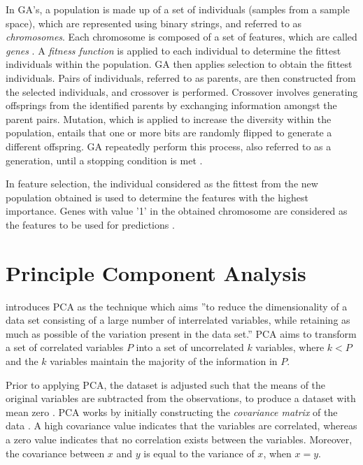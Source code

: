 In GA's, a population is made up of a set of individuals (samples from a sample space), which are represented using binary strings, and referred to as \textit{chromosomes}. Each chromosome is composed of a set of features, which are called \textit{genes} \citep{Siedlecki1989}. A \textit{fitness function} is applied to each individual to determine the fittest individuals within the population. GA then applies selection to obtain the fittest individuals. Pairs of individuals, referred to as parents, are then constructed from the selected individuals, and crossover is performed. Crossover involves generating offsprings from the identified parents by exchanging information amongst the parent pairs. Mutation, which is applied to increase the diversity within the population, entails that one or more bits are randomly flipped to generate a different offspring. GA repeatedly perform this process, also referred to as a generation, until a stopping condition is met \citep{Chaikla}. 

In feature selection, the individual considered as the fittest from the new population obtained is used to determine the features with the highest importance. Genes with value '1' in the obtained chromosome are considered as the features to be used for predictions \citep{sivanandam2007introduction}.


\section{Principle Component Analysis}

\citet{jolliffe2002principal} introduces PCA as the technique which aims ''to reduce the dimensionality of a data set consisting of a large number of interrelated variables, while retaining as much as possible of the variation present in the data set.'' PCA aims to transform a set of correlated variables $P$ into a set of uncorrelated $k$ variables, where $k < P$ and the $k$ variables maintain the majority of the information in $P$. 

Prior to applying PCA, the dataset is adjusted such that the means of the original variables are subtracted from the observations, to produce a dataset with mean zero \citep{jackson2005user}. PCA works by initially constructing the \textit{covariance matrix} of the data \citep{Guan2009}. A high covariance value indicates that the variables are correlated, whereas a zero value indicates that no correlation exists between the variables. Moreover, the covariance between $x$ and $y$ is equal to the variance of $x$, when $x = y$. 

